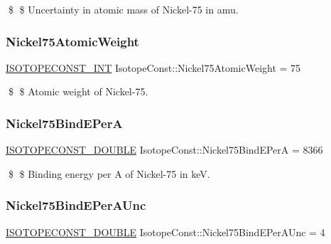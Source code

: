 \$ \$ Uncertainty in atomic mass of Nickel-\/75 in amu. \mbox{\label{group___isotope_const-_nickel-_ni75_ga0f39b09c6e90e8462c07a4515b33202e}} 
\subsubsection{\texorpdfstring{Nickel75\+Atomic\+Weight}{Nickel75AtomicWeight}}
{\footnotesize\ttfamily \mbox{\hyperlink{group___isotope_const-_macros_ga5f18360b3e99483a35c32d789e62621c}{I\+S\+O\+T\+O\+P\+E\+C\+O\+N\+S\+T\+\_\+\+I\+NT}} Isotope\+Const\+::\+Nickel75\+Atomic\+Weight = 75}

\$ \$ Atomic weight of Nickel-\/75. \mbox{\label{group___isotope_const-_nickel-_ni75_ga5c40aea70957502a2b629471bab43e59}} 
\subsubsection{\texorpdfstring{Nickel75\+Bind\+E\+PerA}{Nickel75BindEPerA}}
{\footnotesize\ttfamily \mbox{\hyperlink{group___isotope_const-_macros_ga8f45a7272ce02c0b4c65c44636ed719a}{I\+S\+O\+T\+O\+P\+E\+C\+O\+N\+S\+T\+\_\+\+D\+O\+U\+B\+LE}} Isotope\+Const\+::\+Nickel75\+Bind\+E\+PerA = 8366}

\$ \$ Binding energy per A of Nickel-\/75 in keV. \mbox{\label{group___isotope_const-_nickel-_ni75_ga27838add740f3b746b79682b50f47b79}} 
\subsubsection{\texorpdfstring{Nickel75\+Bind\+E\+Per\+A\+Unc}{Nickel75BindEPerAUnc}}
{\footnotesize\ttfamily \mbox{\hyperlink{group___isotope_const-_macros_ga8f45a7272ce02c0b4c65c44636ed719a}{I\+S\+O\+T\+O\+P\+E\+C\+O\+N\+S\+T\+\_\+\+D\+O\+U\+B\+LE}} Isotope\+Const\+::\+Nickel75\+Bind\+E\+Per\+A\+Unc = 4}

